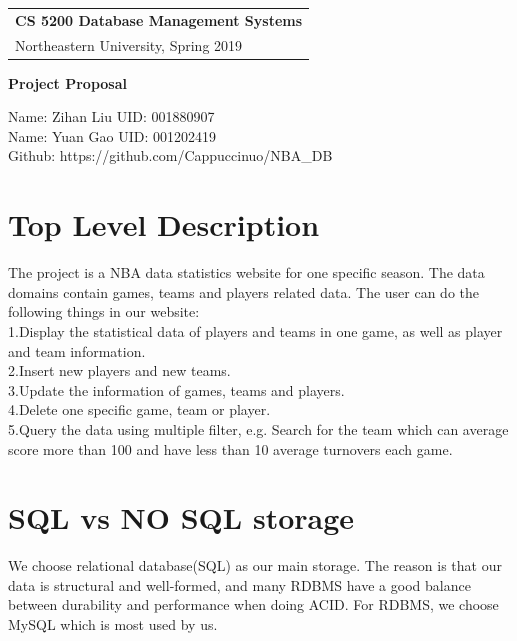 \documentclass[a4paper,12pt]{article} %
\begin{document}
\thispagestyle{empty} %

\begin{tabular}{p{15.5cm}} %
{\large \bf CS 5200 Database Management Systems} \\
Northeastern University, Spring 2019  \\
\hline %
\end{tabular} %

\vspace*{0.3cm} %

\begin{center} %
    {\Large \bf Project Proposal} %
    \vspace{2mm}
    
    {Name: Zihan Liu UID: 001880907}\\
    {Name: Yuan Gao UID: 001202419}\\
    {Github: https://github.com/Cappuccinuo/NBA\_DB}
\end{center} 
%
\vspace{0.2cm}
\section{Top Level Description}
The project is a NBA data statistics website for one specific season. 
The data domains contain games, teams and players related data. The user can do the following things in our website:\\
1.Display the statistical data of players and teams in one game, as well as player and team information.\\
2.Insert new players and new teams.\\
3.Update the information of games, teams and players.\\
4.Delete one specific game, team or player.\\
5.Query the data using multiple filter, e.g. Search for the team which can average score more than 100 and have less
than 10 average turnovers each game.
\section{SQL vs NO SQL storage}
We choose relational database(SQL) as our main storage. The reason is that our data is structural and 
well-formed, and many RDBMS have a good balance between durability and performance when doing ACID. 
For RDBMS, we choose MySQL which is most used by us.
\end{document}
